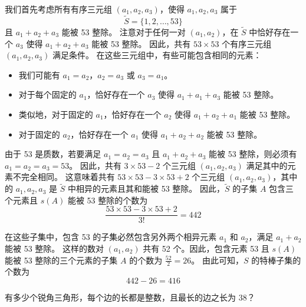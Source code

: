 \begin{questions}
\begin{solution}
我们首先考虑所有有序三元组 $(a_1, a_2, a_3)$，使得 $a_1, a_2, a_3$ 属于
\[ \tilde{S} = \{1, 2, \dots, 53\}  \]
且 $a_1 + a_2 + a_3$ 能被 53 整除。
注意对于任何一对 $(a_1, a_2)$，在 $\tilde{S}$ 中恰好存在一个 $a_3$ 使得 $a_1 + a_2 + a_3$ 能被 53 整除。
因此，共有 $53 \times 53$ 个有序三元组 $(a_1, a_2, a_3)$ 满足条件。
在这些三元组中，有些可能包含相同的元素：
\begin{itemize}
    \item 我们可能有 $a_1 = a_2$，$a_2 = a_3$ 或 $a_3 = a_1$。
    \item 对于每个固定的 $a_1$，恰好存在一个 $a_3$ 使得 $a_1 + a_1 + a_3$ 能被 53 整除。
    \item 类似地，对于固定的 $a_1$，恰好存在一个 $a_2$ 使得 $a_1 + a_2 + a_1$ 能被 53 整除。
    \item 对于固定的 $a_2$，恰好存在一个 $a_1$ 使得 $a_1 + a_2 + a_2$ 能被 53 整除。
\end{itemize}
由于 53 是质数，若要满足 $a_1 = a_2 = a_3$ 且 $a_1 + a_2 + a_3$ 能被 53 整除，则必须有 $a_1 = a_2 = a_3 = 53$。
因此，共有 $3 \times 53 - 2$ 个三元组 $(a_1, a_2, a_3)$ 满足其中的元素不完全相同。
这意味着共有 $53 \times 53 - 3 \times 53 + 2$ 个三元组 $(a_1, a_2, a_3)$，其中的 $a_1, a_2, a_3$ 是 $\tilde{S}$ 中相异的元素且其和能被 53 整除。
因此，$\tilde{S}$ 的子集 $A$ 包含三个元素且 $s(A)$ 能被 53 整除的个数为
\[ \frac{53 \times 53 - 3 \times 53 + 2}{3!} = 442  \]

在这些子集中，包含 53 的子集必然包含另外两个相异元素 $a_1$ 和 $a_2$，满足 $a_1 + a_2$ 能被 53 整除。
这样的数对 $(a_1, a_2)$ 共有 52 个。因此，包含元素 53 且 $s(A)$ 能被 53 整除的三个元素的子集 $A$ 的个数为 $\frac{52}{2} = 26$。
由此可知，$S$ 的特棒子集的个数为
\[ 442 - 26 = 416  \]

\end{solution}

\question 有多少个锐角三角形，每个边的长都是整数，且最长的边之长为 38？


\end{questions}
